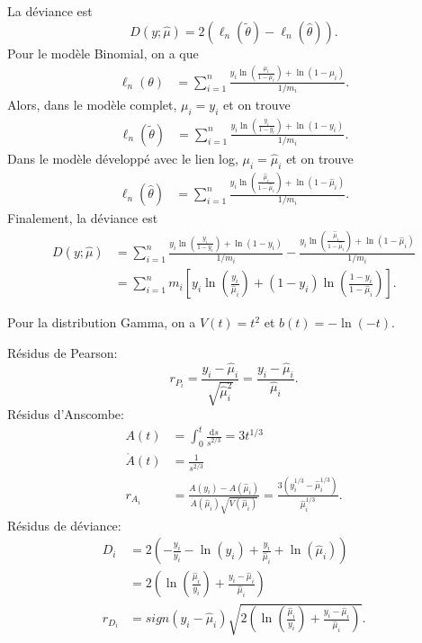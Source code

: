 \begin{solution}{5.5}
La déviance est $$D(y;\hat{\mu})=2(\ell_n(\tilde{\theta})-\ell_n(\hat{\theta})).$$ Pour le modèle Binomial, on a que
\begin{align*}
\ell_n(\theta)&=\sum_{i=1}^n\frac{y_i\ln\left(\frac{\mu_i}{1-\mu_i}\right)+\ln(1-\mu_i)}{1/m_i}.
\end{align*} Alors, dans le modèle complet, $\mu_i=y_i$ et on trouve
\begin{align*}
\ell_n(\tilde{\theta})&=\sum_{i=1}^n\frac{y_i\ln\left(\frac{y_i}{1-y_i}\right)+\ln(1-y_i)}{1/m_i}.
\end{align*}
Dans le modèle développé avec le lien log, $\mu_i=\hat{\mu}_i$ et on trouve
\begin{align*}
\ell_n(\hat{\theta})&=\sum_{i=1}^n\frac{y_i\ln\left(\frac{\hat{\mu}_i}{1-\hat{\mu}_i}\right)+\ln(1-\hat{\mu}_i)}{1/m_i}.
\end{align*}
Finalement, la déviance est
\begin{align*}
D(y;\hat{\mu})&=\sum_{i=1}^n\frac{y_i\ln\left(\frac{y_i}{1-y_i}\right)+\ln(1-y_i)}{1/m_i}-\frac{y_i\ln\left(\frac{\hat{\mu}_i}{1-\hat{\mu}_i}\right)+\ln(1-\hat{\mu}_i)}{1/m_i}\\
&=\sum_{i=1}^n m_i\left[y_i\ln\left(\frac{y_i}{\hat{\mu}_i}\right)+(1-y_i)\ln\left(\frac{1-y_i}{1-\hat{\mu}_i}\right)\right].
\end{align*}
\end{solution}
\begin{solution}{5.6}
Pour la distribution Gamma, on a $V(t)=t^2$ et $b(t)=-\ln(-t)$.

Résidus de Pearson: $$r_{P_i}=\frac{y_i-\hat{\mu}_i}{\sqrt{\hat{\mu}_i^2}}=\frac{y_i-\hat{\mu}_i}{\hat{\mu}_i}.$$
Résidus d'Anscombe:
\begin{align*}
A(t)&=\int_{0}^{t} \frac{\mbox{d}s}{s^{2/3}}=3t^{1/3}\\
\dot{A}(t)&=\frac{1}{s^{2/3}}\\
r_{A_i}&=\frac{A(y_i)-A(\hat{\mu}_i)}{\dot{A}(\hat{\mu}_i)\sqrt{V(\hat{\mu}_i)}}=\frac{3(y_i^{1/3}-\hat{\mu}_i^{1/3})}{\hat{\mu}_i^{1/3}}.
\end{align*}
Résidus de déviance:
\begin{align*}
D_i&=2\left(-\frac{y_i}{y_i}-\ln(y_i)+\frac{y_i}{\hat{\mu}_i}+\ln(\hat{\mu}_i)\right)\\
&=2\left(\ln\left(\frac{\hat{\mu}_i}{y_i}\right)+\frac{y_i-\hat{\mu}_i}{\hat{\mu}_i}\right)\\
r_{D_i}&=sign(y_i-\hat{\mu}_i)\sqrt{2\left(\ln\left(\frac{\hat{\mu}_i}{y_i}\right)+\frac{y_i-\hat{\mu}_i}{\hat{\mu}_i}\right)}.
\end{align*}
\end{solution}
